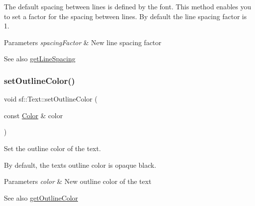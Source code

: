 The default spacing between lines is defined by the font. This method enables you to set a factor for the spacing between lines. By default the line spacing factor is 1.


\begin{DoxyParams}{Parameters}
{\em spacing\+Factor} & New line spacing factor\\
\hline
\end{DoxyParams}
\begin{DoxySeeAlso}{See also}
\mbox{\hyperlink{classsf_1_1_text_a670622e1c299dfd6518afe289c7cd248}{get\+Line\+Spacing}} \begin{DoxyVerb}\end{DoxyVerb}
 
\end{DoxySeeAlso}
\mbox{\label{classsf_1_1_text_aa19ec69c3b894e963602a6804ca68fe4}} 
\subsubsection{\texorpdfstring{setOutlineColor()}{setOutlineColor()}}
{\footnotesize\ttfamily void sf\+::\+Text\+::set\+Outline\+Color (\begin{DoxyParamCaption}\item[{const \mbox{\hyperlink{classsf_1_1_color}{Color}} \&}]{color }\end{DoxyParamCaption})}



Set the outline color of the text. 

By default, the text\textquotesingle{}s outline color is opaque black.


\begin{DoxyParams}{Parameters}
{\em color} & New outline color of the text\\
\hline
\end{DoxyParams}
\begin{DoxySeeAlso}{See also}
\mbox{\hyperlink{classsf_1_1_text_a53559d563461089f1172571b375442dc}{get\+Outline\+Color}} \begin{DoxyVerb}\end{DoxyVerb}
 
\end{DoxySeeAlso}
\mbox{\label{classsf_1_1_text_ab0e6be3b40124557bf53737fe6a6ce77}} 
